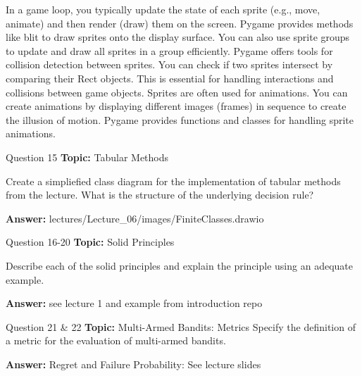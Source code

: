 \begin{frame}
    In a game loop, you typically update the state of each sprite (e.g., move, animate) and then render (draw) them on the screen. Pygame provides methods like blit to draw sprites onto the display surface. You can also use sprite groups to update and draw all sprites in a group efficiently.
    Pygame offers tools for collision detection between sprites. You can check if two sprites intersect by comparing their Rect objects. This is essential for handling interactions and collisions between game objects.
    Sprites are often used for animations. You can create animations by displaying different images (frames) in sequence to create the illusion of motion. Pygame provides functions and classes for handling sprite animations.
\end{frame}

\begin{frame}{Question 15}
    \textbf{Topic:} Tabular Methods
    \vspace{10pt}

    Create a simpliefied class diagram for the implementation of tabular methods from the lecture. What is the structure of the underlying decision rule? 
    \vspace{20pt}

    \textbf{Answer:} lectures/Lecture\_06/images/FiniteClasses.drawio
\end{frame}

\begin{frame}{Question 16-20}
    \textbf{Topic:} Solid Principles

    Describe each of the solid principles and explain the principle using an adequate example. 
    \vspace{20pt}

    \textbf{Answer:} see lecture 1 and example from introduction repo
\end{frame}

\begin{frame}{Question 21 \& 22}
    \textbf{Topic:} Multi-Armed Bandits: Metrics
    \vspace{10pt}
    Specify the definition of a metric for the evaluation of multi-armed bandits.
    \vspace{20pt}

    \textbf{Answer:} Regret and Failure Probability: See lecture slides
\end{frame}

    
